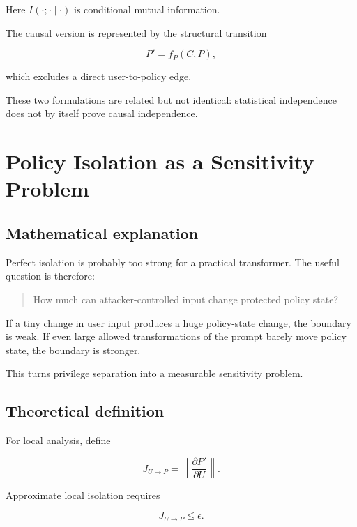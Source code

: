 \documentclass[11pt]{article}
\begin{document}
Here $I(\cdot;\cdot\mid\cdot)$ is conditional mutual information.

The causal version is represented by the structural transition

\begin{equation}
P'=f_P(C,P),
\end{equation}

which excludes a direct user-to-policy edge.

These two formulations are related but not identical:
statistical independence does not by itself prove causal independence.

\section{Policy Isolation as a Sensitivity Problem}

\subsection*{Mathematical explanation}

Perfect isolation is probably too strong for a practical transformer. The
useful question is therefore:

\begin{quote}
How much can attacker-controlled input change protected policy state?
\end{quote}

If a tiny change in user input produces a huge policy-state change, the
boundary is weak. If even large allowed transformations of the prompt barely
move policy state, the boundary is stronger.

This turns privilege separation into a measurable sensitivity problem.

\subsection*{Theoretical definition}

For local analysis, define

\begin{equation}
J_{U\rightarrow P}
=
\left\|
\frac{\partial P'}{\partial U}
\right\|.
\end{equation}

Approximate local isolation requires

\begin{equation}
\boxed{
J_{U\rightarrow P}\leq\epsilon.
}
\end{equation}
\end{document}
